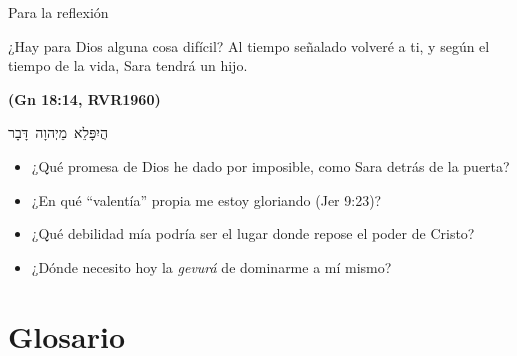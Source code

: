\documentclass[hyperref={bookmarks=false},aspectratio=169]{beamer}
\newcommand{\heb}[1]{\mbox{\foreignlanguage{hebrew}{#1}}}
\newcommand{\fuente}[1]{\par\hfill{\upshape\bfseries\footnotesize\textcolor{azul}{#1}}}
\begin{document}
\begin{frame}{Para la reflexión}
\begin{cita}¿Hay para Dios alguna cosa difícil? Al tiempo señalado volveré a ti, y según el tiempo de la vida, Sara tendrá un hijo.\fuente{(Gn 18:14, RVR1960)}\end{cita}
\begin{center}\heb{הֲיִפָּלֵא מֵיְהוָה דָּבָר}\end{center}
\small
\begin{itemize}
\item ¿Qué promesa de Dios he dado por imposible, como Sara detrás de la puerta?
\item ¿En qué ``valentía'' propia me estoy gloriando (Jer 9:23)?
\item ¿Qué debilidad mía podría ser el lugar donde repose el poder de Cristo?
\item ¿Dónde necesito hoy la \emph{gevurá} de dominarme a mí mismo?
\end{itemize}
\end{frame}

\section{Glosario}
\end{document}
